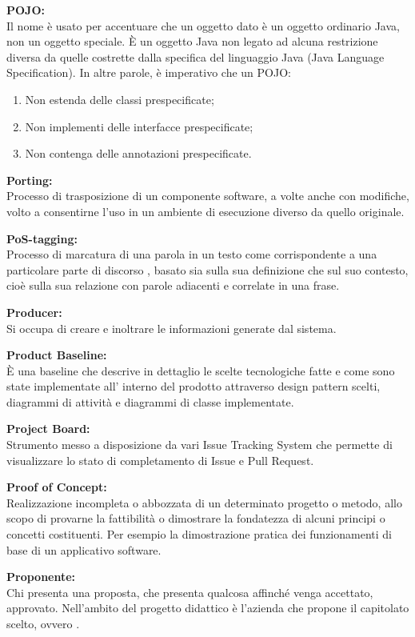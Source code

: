 \documentclass[a4paper, oneside, openany, dvipsnames, table]{article}
\begin{document}
\label{crts:POJO}
\textbf{POJO:}\\	Il nome è usato per accentuare che un oggetto dato è un oggetto ordinario Java, non un oggetto speciale. \`E un oggetto Java non legato ad alcuna restrizione diversa da quelle costrette dalla specifica del linguaggio Java (Java Language Specification). In altre parole, è imperativo che un POJO:
\begin{enumerate}
\item Non estenda delle classi prespecificate;
\item Non implementi delle interfacce prespecificate;
\item Non contenga delle annotazioni prespecificate.
\end{enumerate}

\textbf{Porting:}\\	Processo di trasposizione di un componente software, a volte anche con modifiche, volto a consentirne l'uso in un ambiente di esecuzione diverso da quello originale.

\textbf{PoS-tagging:}\\	 Processo di marcatura di una parola in un testo come corrispondente a una particolare parte di discorso , basato sia sulla sua definizione che sul suo contesto, cioè sulla sua relazione con parole adiacenti e correlate in una frase.

\textbf{Producer:}\\	Si occupa di creare e inoltrare le informazioni generate dal sistema.

\textbf{Product Baseline:}\\	\`E una baseline che descrive in dettaglio le scelte tecnologiche fatte e come sono state implementate all' interno del prodotto attraverso design pattern scelti, diagrammi di attività e diagrammi di classe implementate.

\textbf{Project Board:}\\	Strumento messo a disposizione da vari Issue Tracking System che permette di visualizzare lo stato di completamento di Issue e Pull Request.

\textbf{Proof of Concept:}\\	Realizzazione incompleta o abbozzata di un determinato progetto o metodo, allo scopo di provarne la fattibilità o dimostrare la fondatezza di alcuni principi o concetti costituenti. Per esempio la dimostrazione pratica dei funzionamenti di base di un applicativo software.

\textbf{Proponente:}\\	Chi presenta una proposta, che presenta qualcosa affinché venga accettato, approvato. Nell'ambito del progetto didattico è l'azienda che propone il capitolato scelto, ovvero \proponente.
\end{document}
